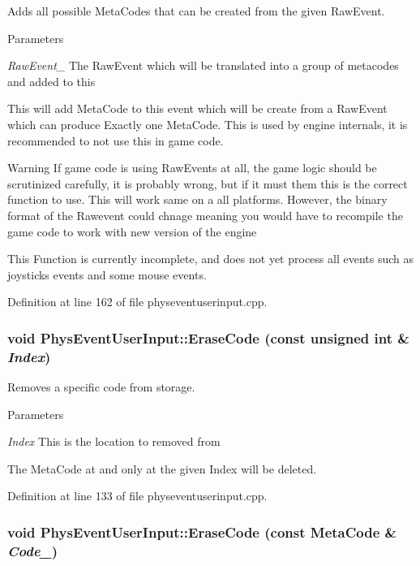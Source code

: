 Adds all possible MetaCodes that can be created from the given RawEvent. 
\begin{DoxyParams}{Parameters}
\item[{\em RawEvent\_\-}]The RawEvent which will be translated into a group of metacodes and added to this\end{DoxyParams}
This will add MetaCode to this event which will be create from a RawEvent which can produce Exactly one MetaCode. This is used by engine internals, it is recommended to not use this in game code. \begin{DoxyWarning}{Warning}
If game code is using RawEvents at all, the game logic should be scrutinized carefully, it is probably wrong, but if it must them this is the correct function to use. This will work same on a all platforms. However, the binary format of the Rawevent could chnage meaning you would have to recompile the game code to work with new version of the engine \par
 This Function is currently incomplete, and does not yet process all events such as joysticks events and some mouse events. 
\end{DoxyWarning}


Definition at line 162 of file physeventuserinput.cpp.\hypertarget{classPhysEventUserInput_a8cbbee3c2be3bd12746ad442fce526e4}{
\subsubsection[{EraseCode}]{\setlength{\rightskip}{0pt plus 5cm}void PhysEventUserInput::EraseCode (const unsigned int \& {\em Index})}}
\label{dc/d0e/classPhysEventUserInput_a8cbbee3c2be3bd12746ad442fce526e4}


Removes a specific code from storage. 
\begin{DoxyParams}{Parameters}
\item[{\em Index}]This is the location to removed from\end{DoxyParams}
The MetaCode at and only at the given Index will be deleted. 

Definition at line 133 of file physeventuserinput.cpp.\hypertarget{classPhysEventUserInput_a1dbd2996770df334fba9f67d9bb4ffa0}{
\subsubsection[{EraseCode}]{\setlength{\rightskip}{0pt plus 5cm}void PhysEventUserInput::EraseCode (const {\bf MetaCode} \& {\em Code\_\-})}}
\label{dc/d0e/classPhysEventUserInput_a1dbd2996770df334fba9f67d9bb4ffa0}


